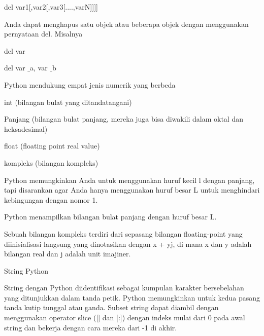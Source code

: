 \vspace{12pt}
\noindent 
del var1[,var2[,var3[....,varN]]]] \par
\vspace{12pt}
\noindent 
Anda dapat menghapus satu objek atau beberapa objek dengan menggunakan pernyataan del. $  $Misalnya  \par
\vspace{12pt}
\noindent 
del var \par
\noindent 
del var $  \_  $a, var $  \_  $b \par
\vspace{12pt}
\noindent 
Python mendukung empat jenis numerik yang berbeda  \par
\vspace{12pt}
\noindent 
int (bilangan bulat yang ditandatangani) \par
\vspace{12pt}
\noindent 
Panjang (bilangan bulat panjang, mereka juga bisa diwakili dalam oktal dan heksadesimal) \par
\vspace{12pt}
\noindent 
float (floating point real value) \par
\vspace{12pt}
\noindent 
kompleks (bilangan kompleks) \par
\vspace{12pt}
\noindent 
Python memungkinkan Anda untuk menggunakan huruf kecil l dengan panjang, tapi disarankan agar Anda hanya menggunakan huruf besar L untuk menghindari kebingungan dengan nomor 1.  \par
\noindent 
Python menampilkan bilangan bulat panjang dengan huruf besar L. \par
\vspace{12pt}
\noindent 
Sebuah bilangan kompleks terdiri dari sepasang bilangan floating-point yang diinisialisasi langsung yang dinotasikan dengan x + yj, di mana x dan y adalah bilangan real dan j adalah unit imajiner. \par
\vspace{12pt}
\noindent 
String Python \par
\vspace{12pt}
\noindent 
String dengan Python diidentifikasi sebagai kumpulan karakter bersebelahan yang ditunjukkan dalam tanda petik. $  $Python memungkinkan untuk kedua pasang tanda kutip tunggal atau ganda. $  $Subset string dapat diambil dengan menggunakan operator slice ([] dan [:]) dengan indeks mulai dari 0 pada awal string dan bekerja dengan cara mereka dari -1 di akhir. \par
